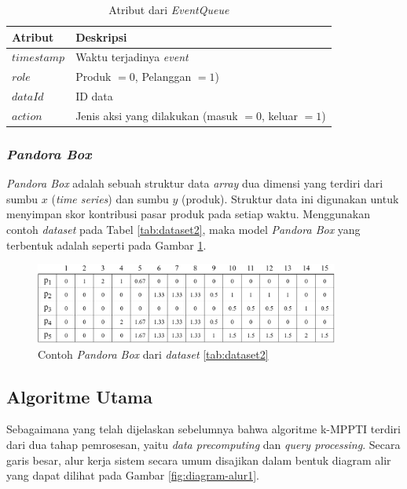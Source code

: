 \begin{table}[H]
	\centering
	\begin{tabular}{|p{2cm}|p{6cm}|}
		\hline
		\textbf{Atribut} & \textbf{Deskripsi} \\ \hline \hline
		$timestamp$ & Waktu terjadinya \textit{event} \\ \hline
		$role$ & Produk $= 0$, Pelanggan $= 1$) \\ \hline
		$dataId$ & ID data\\ \hline
		$action$ & Jenis aksi yang dilakukan (masuk $= 0$, keluar $= 1$) \\ \hline
	\end{tabular} 
	\caption{Atribut dari \textit{EventQueue}}
	\label{tab:attr-event-queue}
\end{table}

\subsubsection{\textit{Pandora Box}}
\tab \textit{Pandora Box} adalah sebuah struktur data \textit{array} dua dimensi yang terdiri dari sumbu $x$ (\textit{time series}) dan sumbu $y$ (produk). Struktur data ini digunakan untuk menyimpan skor kontribusi pasar produk pada setiap waktu. Menggunakan contoh \textit{dataset} pada Tabel \ref{tab:dataset2}, maka model \textit{Pandora Box} yang terbentuk adalah seperti pada Gambar \ref{fig:pbox}.  

\begin{figure}[h]
	\centering
	\includegraphics[width=10cm]{assets/img/bab3/pbox.png}
	\caption{Contoh \textit{Pandora Box} dari \textit{dataset} \ref{tab:dataset2}}
	\label{fig:pbox}
\end{figure}

\subsection{Algoritme Utama}
\tab Sebagaimana yang telah dijelaskan sebelumnya bahwa algoritme k-MPPTI terdiri dari dua tahap pemrosesan, yaitu \textit{data precomputing} dan \textit{query processing}. Secara garis besar, alur kerja sistem secara umum disajikan dalam bentuk diagram alir yang dapat dilihat pada Gambar \ref{fig:diagram-alur1}.


